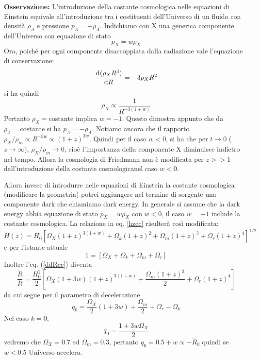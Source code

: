 {\bf Osservazione:} L'introduzione della costante cosmologica nelle equazioni di
Einstein equivale all'introduzione tra i costituenti dell'Universo di un fluido
con densità $\rho_{\Lambda}$ e pressione $p_{\Lambda}=-\rho_{\Lambda}$.
Indichiamo con X una generica componente dell'Universo con equazione di stato
\begin{equation}
  p_X = w \rho_X
\end{equation}
Ora, poiché per ogni componente disaccoppiata dalla radiazione vale l'equazione
di conservazione:
\begin{equation}
  \frac{{\mathop{}\!\mathrm{d}^{}}(\rho_X R^3)}{\mathop{}\!\mathrm{d} {R}^{}} = -3 p_X R^2
\end{equation}
si ha quindi
\begin{equation}
  \rho_X \propto \frac {1}{R^{-3(1+w)}}
\end{equation}
Pertanto $\rho_{X}=\text{costante}$ implica $w=-1$.  Questo dimostra appunto che
da $\rho_{\Lambda}=\text{costante}$ si ha $p_{\Lambda}=-\rho_{\Lambda}$.
Notiamo ancora che il rapporto
$\rho_{X}/\rho_m \propto R^{-3w} \propto (1+z)^{3w}$.  Quindi per il caso $w<0$,
si ha che per $t \to 0$ ($z \to \infty$), $\rho_{X}/\rho_m \to 0$, cioè
l'importanza della componente X diminuisce indietro nel tempo.  Allora la
cosmologia di Friedmann non è modificata per $z>>1$ dall'introduzione della
costante cosmologicanel caso $w<0$.

Allora invece di introdurre nelle equazioni di Einstein la costante cosmologica
(modificare la geometria) potrei aggiungere nel termine di sorgente una
componente dark che chiamiamo dark energy.  In generale si assume che la dark
energy abbia equazione di stato $p_X=w\rho_X$ con $w<0$, il caso $w=-1$ include
la costante cosmologica. La relazione in eq. \eqref{hzcc} risulterà così
modificata:
\begin{equation}
  H(z)=H_0 \left[ \Omega_{X} (1+z)^{3(1+w)} + \Omega_{k} (1+z)^2+ \Omega_m (1+z)^3 + \Omega_r (1+z)^4 \right]^{1/2}
  \label{hzccX}
\end{equation}
e per l'istante attuale
\begin{equation}
  1= \left[ \Omega_{X} + \Omega_{k} + \Omega_m  + \Omega_r \right]
 \end{equation}
Inoltre l'eq. (\ref{ddRcc}) diventa
\begin{equation}
  \frac {\ddot{R}} {R} = \frac{H_0^2}{2}
  \left[ \Omega_{X} (1+3w) (1+z)^{3(1+w)}
    +\frac {\Omega_m (1+z)^3} {2 }  +
    \Omega_r (1+z)^4 \right]
  \label {ddRw}
\end{equation}
da cui segue per il parametro di decelerazione
\begin{equation}
  q_0= \frac{\Omega_X}{2} (1+3w) +  \frac{\Omega_m}{2} + \Omega_r - \Omega_{k}
\end{equation}
Nel caso $k=0$,
\begin{equation}
  q_0= \frac {1+3w \Omega_{X}}{2}
\end{equation}
vedremo che $\Omega_{X}=0.7$ ed $\Omega_{m}=0.3$, pertanto
$q_0=0.5+w \propto - \ddot{R}_0$ quindi se $w<0.5$ Universo accelera.

